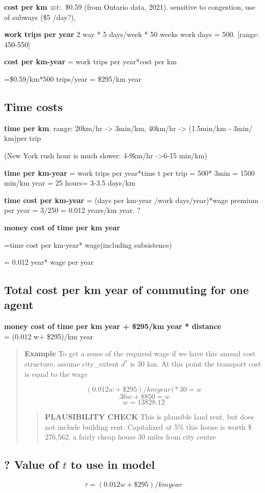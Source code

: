 \textbf{cost per km =$\textit{t}$}:. \$0.59   (from  Ontario data, 2021). sensitive to congestion, use of subways (\$5 /day?), 

 \textbf{work trips per year} 2 way * 5 days/week * 50 weeks work days = 500. [range: 450-550]

\textbf{cost per km-year} = work trips per year*cost per km

=\$0.59/km*500 trips/year  =  \$295/km year 



\subsection{Time costs}
\textbf{time per km}. range: 20km/hr -> 3min/km, 40km/hr -> (1.5min/km - 3min/ km)per trip 

(New York rush hour is much slower:  4-9km/hr ->6-15 min/km)

\textbf{time  per km-year} = work trips per year*time t per trip = 500* 3min  = 1500 min/km year = 25 hours= 3-3.5 days/km
 
\textbf{time cost per km-year} =  (days per km-year /work days/year)*wage premium per year  = 3/250 = 0.012 years/km year. ?

\textbf{money cost of time per km year} 

=time cost per km-year* wage(including subsistence) 

= 0.012 year* wage per year

\subsection{Total cost per km year of commuting for one agent}
\textbf{money cost of time per km year + \$295/km year * distance} \\
= (0.012 w+ \$295)/km year 
    \begin{quotation}
    \textbf{Example}
    To get a sense of the required wage if we have this annual cost structure, assume city\_extent $d^*$ is 30 km. At this point the transport cost is equal to the wage

\[(0.012 w+ \$295)/km year)*30 =  w\] 
\[.36w+ 8850=w\]
\[w=13828.12\]
        \begin{quotation}
        \textbf{PLAUSIBILITY CHECK}
This is plausible land rent, but does not include building rent. 
Capitalized at 5\% this house is worth \$ 276,562, a fairly cheap house 30 miles from city centre
        \end{quotation}
    \end{quotation}

{\color{red}
\subsection{? Value of $t$ to use in model}
\[ \tau=(0.012 w+ \$295)/km year \]}
